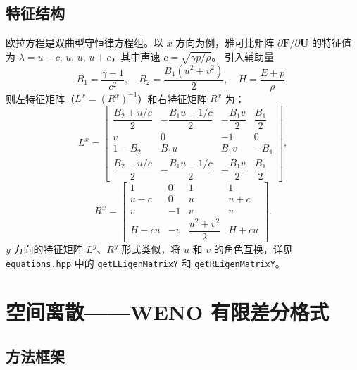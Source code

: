 \documentclass{article}
\numberwithin{equation}{section}
\begin{document}
\subsection{特征结构}

欧拉方程是双曲型守恒律方程组。以 $x$ 方向为例，雅可比矩阵 $\partial \mathbf{F}/\partial \mathbf{U}$
的特征值为 $\lambda = u-c,\, u,\, u,\, u+c$，其中声速 $c = \sqrt{\gamma p/\rho}$。
引入辅助量
\begin{equation}
    B_1 = \frac{\gamma - 1}{c^2}, \quad B_2 = \frac{B_1(u^2+v^2)}{2}, \quad H = \frac{E+p}{\rho},
\end{equation}
则左特征矩阵（$L^x = (R^x)^{-1}$）和右特征矩阵 $R^x$ 为：
\begin{equation}
    L^x = \begin{bmatrix}
        \dfrac{B_2 + u/c}{2} & -\dfrac{B_1 u + 1/c}{2} & -\dfrac{B_1 v}{2} & \dfrac{B_1}{2} \\[6pt]
        v & 0 & -1 & 0 \\[6pt]
        1 - B_2 & B_1 u & B_1 v & -B_1 \\[6pt]
        \dfrac{B_2 - u/c}{2} & -\dfrac{B_1 u - 1/c}{2} & -\dfrac{B_1 v}{2} & \dfrac{B_1}{2}
    \end{bmatrix},
\end{equation}
\begin{equation}
    R^x = \begin{bmatrix}
        1 & 0 & 1 & 1 \\
        u-c & 0 & u & u+c \\
        v & -1 & v & v \\
        H - cu & -v & \dfrac{u^2+v^2}{2} & H + cu
    \end{bmatrix}.
\end{equation}
$y$ 方向的特征矩阵 $L^y$、$R^y$ 形式类似，将 $u$ 和 $v$ 的角色互换，详见
\texttt{equations.hpp} 中的 \texttt{getLEigenMatrixY} 和 \texttt{getREigenMatrixY}。

\section{空间离散——WENO 有限差分格式}

\subsection{方法框架}
\end{document}
